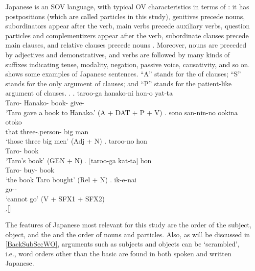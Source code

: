 Japanese is an SOV language, with typical OV characteristics
in terms of :
it has postpositions (which are called particles in this study),
genitives precede nouns,
 subordinators appear after the verb,
main verbs precede auxiliary verbs,
question particles and complementizers appear after the verb,
subordinate clauses precede main clauses, and
relative clauses precede nouns
\cite{shibatani90,masuokatakubo92}.
Moreover,
nouns are preceded by adjectives and demonstratives,
and verbs are followed by many kinds of suffixes indicating tense, modality, negation, passive voice, causativity, and so on.
\Next shows some examples of Japanese sentences.
``A'' stands for the  of  clauses;
``S'' stands for the only argument of  clauses; and
``P'' stands for the patient-like argument of  clauses.
%
\ex.
     \ag. taroo-ga hanako-ni hon-o yat-ta \\
        Taro- Hanako- book- give- \\
        `Taro gave a book to Hanako.' \hfill{(A + DAT + P + V)}
     \bg. sono san-nin-no ookina otoko \\
          that three-.person- big man \\
          `those three big men' \hfill{(Adj + N)}
     \bg. taroo-no hon \\
          Taro- book \\
          `Taro's book' \hfill{(GEN + N)}
     \bg. [taroo-ga kat-ta] hon \\
           Taro- buy- book \\
           `the book Taro bought' \hfill{(Rel + N)}
     \bg. ik-e-nai \\
          go-- \\
          `cannot go' \hfill{(V + SFX1 + SFX2)} \\
     \b.[] \hfill{\cite[257--258, glosses modified by NN]{shibatani90}}

The features of Japanese most relevant for this study are the order of the subject, object, and the  and the order of nouns and particles.
Also, as will be discussed in \ref{BackSubSecWO},
arguments such as subjects and objects can be `scrambled',
i.e., word orders other than the basic  are found in both spoken and written Japanese.

